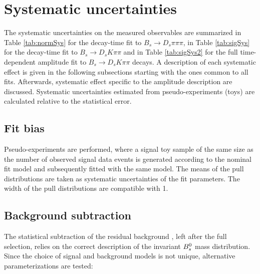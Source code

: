 \section{Systematic uncertainties}
\label{sec:Systematics}

The systematic uncertainties on the measured observables are summarized in Table \ref{tab:normSys} for the decay-time fit to $B_s \to D_s \pi\pi\pi$,
in Table \ref{tab:sigSys} for the decay-time fit to $B_s \to D_s K\pi\pi$
and in Table \ref{tab:sigSys2} for the full time-dependent amplitude fit to $B_s \to D_s K\pi\pi$ decays. 
A description of each systematic
effect is given in the following subsections
starting with the ones common to all fits.
Afterwards, systematic effect specific to the amplitude description are discussed.
Systematic uncertainties estimated from pseudo-experiments (toys) are calculated relative to the statistical error.


\subsection{Fit bias}
\label{subsec:SystFit}

Pseudo-experiments are performed, where a signal toy sample of the same size as the number of observed signal data events is generated according to the nominal fit model 
and subsequently fitted with the same model.
The means of the pull distributions are taken as systematic uncertainties of the fit parameters. The width of the pull distributions are compatible with 1.  

\subsection{Background subtraction}
\label{subsec:SystMass}

The statistical subtraction of the residual background \cite{Pivk:2004ty}, left after the full selection, relies on the correct description of the invariant ${{B}^0_{s}}$ mass distribution.
Since the choice of signal and background models is not unique, alternative parameterizations are tested:

